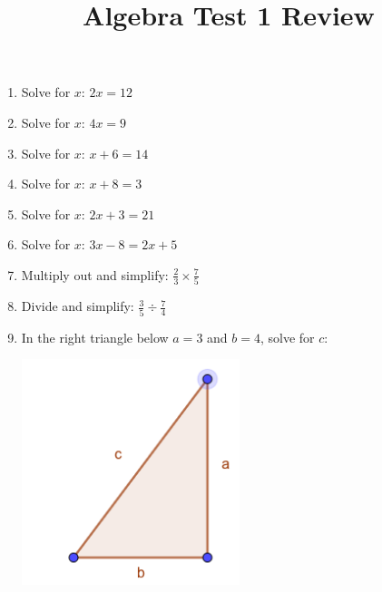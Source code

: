 \documentclass[12pt]{article}
\title{Algebra Test 1 Review}
\begin{document}
{}
\begin{enumerate}
	\item Solve for $x$: $2x=12$
	
	\item Solve for $x$: $4x=9$
	
	\item Solve for $x$: $x+6=14$
	
	\item Solve for $x$: $x+8=3$
	
	\item Solve for $x$: $2x+3=21$
	
	\item Solve for $x$: $3x-8 = 2x+5$
	
	\item Multiply out and simplify: $\displaystyle \frac{2}{3} \times \frac{7}{5}$
	
	\item Divide and simplify: $\displaystyle \frac{3}{5} \div \frac{7}{4}$
	
	
	\pagebreak
	\item In the right triangle below $a=3$ and $b=4$, solve for $c$:
	
	\includegraphics[width=2.5in]{345triangle.png}
	

\end{enumerate}
\end{document}
